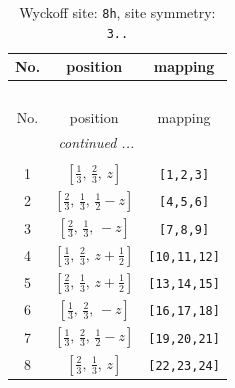 \documentclass[fleqn,8pt]{jsarticle}
\begin{document}
\begin{longtable}{ccc}
\caption{Wyckoff site: {\tt 8h}, site symmetry: {\tt 3..}}
 \\
 \hline \hline
No. & position & mapping \\ \hline \endfirsthead

\multicolumn{2}{l}{\tablename\ \thetable{}} \\
 \hline \hline
No. & position & mapping \\ \hline \endhead

 \hline \hline
\multicolumn{2}{r}{\footnotesize\it continued ...} \\ \endfoot

 \hline \hline
\multicolumn{2}{r}{} \\ \endlastfoot

1 & $\left[ \frac{1}{3},\, \frac{2}{3},\, z \right]$ & {\tt [1,2,3]} \\ \hline
2 & $\left[ \frac{2}{3},\, \frac{1}{3},\, \frac{1}{2} - z \right]$ & {\tt [4,5,6]} \\ \hline
3 & $\left[ \frac{2}{3},\, \frac{1}{3},\, - z \right]$ & {\tt [7,8,9]} \\ \hline
4 & $\left[ \frac{1}{3},\, \frac{2}{3},\, z + \frac{1}{2} \right]$ & {\tt [10,11,12]} \\ \hline
5 & $\left[ \frac{2}{3},\, \frac{1}{3},\, z + \frac{1}{2} \right]$ & {\tt [13,14,15]} \\ \hline
6 & $\left[ \frac{1}{3},\, \frac{2}{3},\, - z \right]$ & {\tt [16,17,18]} \\ \hline
7 & $\left[ \frac{1}{3},\, \frac{2}{3},\, \frac{1}{2} - z \right]$ & {\tt [19,20,21]} \\ \hline
8 & $\left[ \frac{2}{3},\, \frac{1}{3},\, z \right]$ & {\tt [22,23,24]} \\
\end{longtable}
\renewcommand{\arraystretch}{1.2}
\end{document}
